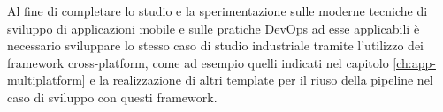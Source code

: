 Al fine di completare lo studio e la sperimentazione sulle moderne tecniche di sviluppo di applicazioni mobile e sulle pratiche DevOps ad esse applicabili è necessario sviluppare lo stesso caso di studio industriale tramite l'utilizzo dei framework cross-platform, come ad esempio quelli indicati nel capitolo \ref{ch:app-multiplatform} e la realizzazione di altri template per il riuso della pipeline nel caso di sviluppo con questi framework.
